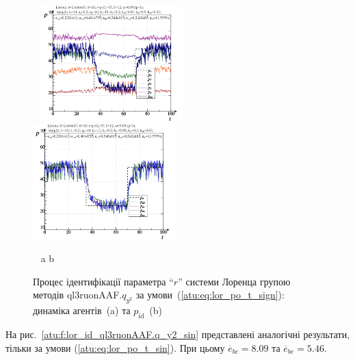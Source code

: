\begin{figure}[ht!]
  \begin{center}
    ~ \hfill
    \includegraphics[width=0.49\textwidth]{p/cha/lor/ql3ruonAAF/lor_ql3ruonAAF_qy2-p_t_pi_sign.png}
    \hfill
    \includegraphics[width=0.49\textwidth]{p/cha/lor/ql3ruonAAF/lor_ql3ruonAAF_qy2-p_t_pz_sign.png}
    \hfill ~
  \end{center}
  \vspace{-1.0ex}
  \begin{center}
    ~ \hfill a \hfill\hfill b \hfill ~
  \end{center}
  \vspace{-1.5ex}
\caption{Процес ідентифікації параметра ``$r$'' системи Лоренца групою методів ql3ruonAAF.$q_{y^2}$ за умови~(\ref{atu:eq:lor_po_t_sign}): динаміка агентів~(a) та $p_\mathrm{id}$~(b)}
  \label{atu:f:lor_id_ql3ruonAAF.q_y2_sign}
\end{figure}


На рис.~\ref{atu:f:lor_id_ql3ruonAAF.q_y2_sin} представлені аналогічні результати,
тільки за умови (\ref{atu:eq:lor_po_t_sin}). При цьому
$\overline{e}_{bc}=8.09$
та
$\overline{e}_{be}=5.46$.


